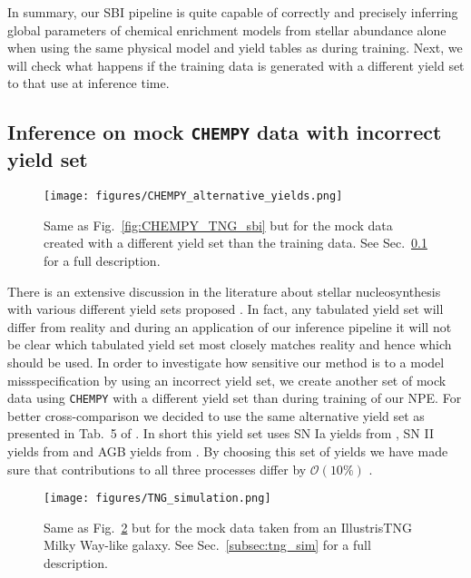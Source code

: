 \documentclass{aa}
\begin{document}
In summary, our SBI pipeline is quite capable of correctly and precisely inferring  global parameters of chemical enrichment models from stellar abundance alone when using the same physical model and yield tables as during training. Next, we will check what happens if the training data is generated with a different yield set to that use at inference time.


\subsection{Inference on mock \texttt{CHEMPY} data with incorrect yield set}
\label{subsec:mocks_wrong_yield}

\begin{figure}
    \centering
    \texttt{[image: figures/CHEMPY\_alternative\_yields.png]}
    \vspace{-.25cm}
    \caption{Same as Fig.~\ref{fig:CHEMPY_TNG_sbi} but for the mock data created with a different yield set than the training data. See Sec.~\ref{subsec:mocks_wrong_yield} for a full description.}
    \label{fig:CHEMPY_alt_sbi} 
\end{figure}

There is an extensive discussion in the literature about stellar nucleosynthesis with various different yield sets proposed \citep[see e.g. discussion in][]{Rybizki_2017}. In fact, any tabulated yield set will differ from reality and during an application of our inference pipeline it will not be clear which tabulated yield set most closely matches reality and hence which should be used.
In order to investigate how sensitive our method is to a model missspecification by using an incorrect yield set, we create another set of mock data using \texttt{CHEMPY} with a different yield set than during training of our NPE. For better cross-comparison we decided to use the same alternative yield set as presented in Tab.~5 of \citep{Philcox_2019}. In short this yield set uses SN Ia yields from \citet{2003NuPhA.718..139T}, SN II yields from \citet{2013ARA&A..51..457N} and AGB yields from \citet{2016ApJ...825...26K}. By choosing this set of yields we have made sure that contributions to all three processes differ by $\mathcal{O}(10\%)$ \citep[see Sec.~6.2 of][for more details]{Philcox_2019}.

\begin{figure}
    \centering
    \texttt{[image: figures/TNG\_simulation.png]}
    \vspace{-.25cm}
    \caption{Same as Fig.~\ref{fig:CHEMPY_TNG_sim_sbi} but for the mock data taken from an IllustrisTNG Milky Way-like galaxy. See Sec.~\ref{subsec:tng_sim} for a full description.}
    \label{fig:CHEMPY_TNG_sim_sbi} 
\end{figure}
\end{document}
